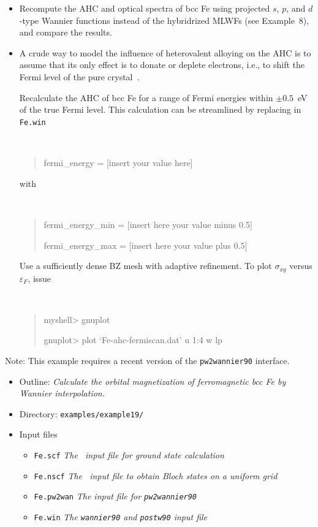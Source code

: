 \documentclass[a4paper,11pt,twoside]{article}
\begin{document}
\begin{itemize}

\item Recompute the AHC and optical spectra of bcc Fe using projected
  $s$, $p$, and $d$-type Wannier functions instead of the hybridrized
  MLWFs (see Example~8), and compare the results.

\item A crude way to model the influence of heterovalent alloying on
  the AHC is to assume that its only effect is to donate or deplete
  electrons, i.e., to shift the Fermi level of the pure
  crystal~\cite{yao-prb07}.

Recalculate the AHC of bcc Fe for a range of Fermi energies within
$\pm 0.5$~eV of the true Fermi level. This calculation can be
streamlined by replacing in {\tt Fe.win} {\tt
\begin{quote}
fermi\_energy = [insert your value here]
\end{quote} }
%
with
%
{\tt
\begin{quote}
fermi\_energy\_min = [insert here your value minus 0.5]

fermi\_energy\_max = [insert here your value plus 0.5]
\end{quote} }
%
Use a sufficiently dense BZ mesh with adaptive refinement. To plot
$\sigma_{xy}$ versus $\varepsilon_F$, issue
%
{\tt
\begin{quote}
myshell> gnuplot

gnuplot> plot `Fe-ahc-fermiscan.dat' u 1:4 w lp
\end{quote} }

\end{itemize}




Note: This example requires a recent version of the {\tt pw2wannier90} interface.

\begin{itemize}
\item{Outline: \it{Calculate the orbital magnetization of
      ferromagnetic bcc Fe by Wannier interpolation.}}
\item{Directory: {\tt examples/example19/}}
\item{Input files}
\begin{itemize}
\item{ {\tt Fe.scf} {\it The \pwscf\ input file for ground state
    calculation}}
\item{ {\tt Fe.nscf}  {\it The \pwscf\ input file to obtain Bloch
    states on a uniform grid}} 
\item{ {\tt Fe.pw2wan}  {\it The input file for {\tt pw2wannier90}}}
\item{ {\tt Fe.win} {\it The {\tt wannier90} and {\tt postw90} input
      file}}
\end{itemize}
\end{itemize}
\end{document}
